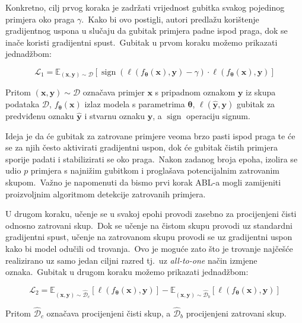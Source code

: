 \documentclass[diplomskirad]{fer}
\begin{document}
Konkretno, cilj prvog koraka je zadržati vrijednost gubitka svakog pojedinog primjera oko praga $\gamma$.\
Kako bi ovo postigli, autori predlažu korištenje gradijentnog uspona u slučaju da gubitak primjera padne ispod praga, dok se inače koristi gradijentni spust.\ Gubitak u prvom koraku možemo prikazati jednadžbom:

\begin{equation}
  \mathcal{L}_1 = \mathbb{E}_{(\bm{x}, \bm{y}) \sim \mathcal{D}} \left[ \operatorname{sign} \left( \ell(f_{\bm{\theta}}(\bm{x}), \bm{y}) - \gamma \right) \cdot \ell(f_{\bm{\theta}}(\bm{x}), \bm{y}) \right]
  \label{eq:abl1}
\end{equation}

Pritom $(\bm{x}, \bm{y}) \sim \mathcal{D}$ označava primjer $\bm{x}$ s pripadnom oznakom $\bm{y}$ iz skupa podataka $\mathcal{D}$, $f_{\bm{\theta}}(\bm{x})$ izlaz modela s parametrima $\bm{\theta}$, $\ell(\bm{\hat{y}}, \bm{y})$ gubitak za predviđenu oznaku $\bm{\hat{y}}$ i stvarnu oznaku $\bm{y}$, a $\operatorname{sign}$ operaciju signum.\ 
  
Ideja je da će gubitak za zatrovane primjere veoma brzo pasti ispod praga te će se za njih često aktivirati gradijentni uspon, dok će gubitak čistih primjera sporije padati i stabilizirati se oko praga.\ 
Nakon zadanog broja epoha, izolira se udio $p$ primjera s najnižim gubitkom i proglašava potencijalnim zatrovanim skupom.\ Važno je napomenuti da bismo prvi korak ABL-a mogli zamijeniti proizvoljnim algoritmom detekcije zatrovanih primjera.\ 
  
U drugom koraku, učenje se u svakoj epohi provodi zasebno za procijenjeni čisti odnosno zatrovani skup.\ 
Dok se učenje na čistom skupu provodi uz standardni gradijentni spust, učenje na zatrovanom skupu provodi se uz gradijentni uspon kako bi model odučili od trovanja.\ 
Ovo je moguće zato što je trovanje najčešće realizirano uz samo jedan ciljni razred tj.\ uz \textit{all-to-one} način izmjene oznaka.\ Gubitak u drugom koraku možemo prikazati jednadžbom:

\begin{equation}
  \mathcal{L}_2 = \mathbb{E}_{(\bm{x}, \bm{y}) \sim \hat{\mathcal{D}}_c} \left[ \ell(f_{\bm{\theta}}(\bm{x}), \bm{y}) \right] - \mathbb{E}_{(\bm{x}, \bm{y}) \sim \hat{\mathcal{D}}_b} \left[ \ell(f_{\bm{\theta}}(\bm{x}), \bm{y}) \right]
  \label{eq:abl2}
\end{equation}

Pritom $\hat{\mathcal{D}}_c$ označava procijenjeni čisti skup, a $\hat{\mathcal{D}}_b$ procijenjeni zatrovani skup.\
\end{document}
